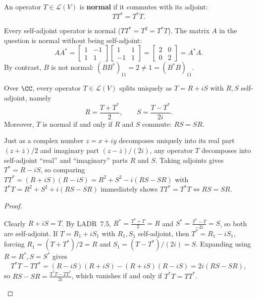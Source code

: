 \documentclass[10pt]{scrartcl}
\newcommand{\LL}{\mathcal L}\newcommand{\PP}{\mathcal P}\newcommand{\MM}{\mathcal M}
\begin{document}
\begin{definition*}
  An operator $T\in\LL(V)$ is \textbf{normal} if it commutes with its adjoint:
  \[
    TT^* = T^*T.
  \]
\end{definition*}

Every self-adjoint operator is normal ($TT^*=T^2=T^*T$). The matrix $A$ in the question is normal without being self-adjoint:
\[
  AA^* = \begin{bmatrix}1&-1\\1&1\end{bmatrix}\begin{bmatrix}1&1\\-1&1\end{bmatrix} = \begin{bmatrix}2&0\\0&2\end{bmatrix} = A^*A.
\]
By contrast, $B$ is not normal: $(BB^*)_{11}=2\neq 1=(B^*B)_{11}$.

\begin{proposition*}
  Over $\CC$, every operator $T\in\LL(V)$ splits uniquely as $T=R+iS$ with $R,S$ self-adjoint, namely
  \[
    R = \frac{T+T^*}{2}, \qquad S = \frac{T-T^*}{2i}.
  \]
  Moreover, $T$ is normal if and only if $R$ and $S$ commute: $RS=SR$.
\end{proposition*}
\begin{ideabox}
  Just as a complex number $z=x+iy$ decomposes uniquely into its real part $(z+\overline{z})/2$ and imaginary part $(z-\overline{z})/(2i)$, any operator $T$ decomposes into self-adjoint ``real'' and ``imaginary'' parts $R$ and $S$. Taking adjoints gives $T^*=R-iS$, so comparing $TT^*=(R+iS)(R-iS)=R^2+S^2-i(RS-SR)$ with $T^*T=R^2+S^2+i(RS-SR)$ immediately shows $TT^*=T^*T \iff RS=SR$.
\end{ideabox}
\begin{proof}
  \begin{steps}
    \ii Clearly $R+iS=T$. By LADR~7.5, $R^*=\frac{T^*+T}{2}=R$ and $S^*=\frac{T^*-T}{-2i}=S$, so both are self-adjoint. If $T=R_1+iS_1$ with $R_1,S_1$ self-adjoint, then $T^*=R_1-iS_1$, forcing $R_1=(T+T^*)/2=R$ and $S_1=(T-T^*)/(2i)=S$.
    \ii Expanding using $R=R^*,S=S^*$ gives
    \[
      T^*T - TT^* = (R-iS)(R+iS) - (R+iS)(R-iS) = 2i(RS-SR),
    \]
    so $RS-SR = \frac{T^*T-TT^*}{2i}$, which vanishes if and only if $T^*T=TT^*$.
  \end{steps}
\end{proof}
\end{document}
